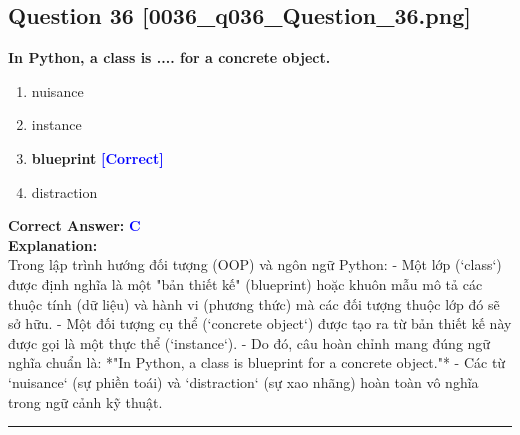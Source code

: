 \documentclass[11pt,a4paper]{article}
\begin{document}
\begin{minipage}{\textwidth}
\subsection*{Question 36 \quad \footnotesize{[0036_q036_Question_36.png]}}
\noindent \textbf{In Python, a class is .... for a concrete object.}

\begin{enumerate}[label=\Alph*.]
    \item nuisance
    \item instance
    \item \textbf{blueprint} \hfill \textcolor{blue}{\textbf{[Correct]}}
    \item distraction
\end{enumerate}

\noindent \textbf{Correct Answer:} \textcolor{blue}{\textbf{C}} \\[4pt]
\noindent \textbf{Explanation:}\\
Trong lập trình hướng đối tượng (OOP) và ngôn ngữ Python:\newline
- Một lớp (`class`) được định nghĩa là một "bản thiết kế" (blueprint) hoặc khuôn mẫu mô tả các thuộc tính (dữ liệu) và hành vi (phương thức) mà các đối tượng thuộc lớp đó sẽ sở hữu.\newline
- Một đối tượng cụ thể (`concrete object`) được tạo ra từ bản thiết kế này được gọi là một thực thể (`instance`).\newline
- Do đó, câu hoàn chỉnh mang đúng ngữ nghĩa chuẩn là: *"In Python, a class is blueprint for a concrete object."*\newline
- Các từ `nuisance` (sự phiền toái) và `distraction` (sự xao nhãng) hoàn toàn vô nghĩa trong ngữ cảnh kỹ thuật.
\end{minipage}
\vspace{0.8cm}
\hrule
\vspace{0.5cm}
\end{document}
